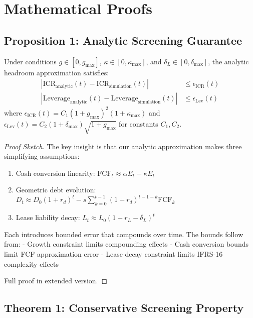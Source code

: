 
\appendix
\section{Mathematical Proofs}

\subsection{Proposition 1: Analytic Screening Guarantee}

\begin{proposition}
Under conditions $g \in [0, g_{\max}]$, $\kappa \in [0, \kappa_{\max}]$, and $\delta_L \in [0, \delta_{\max}]$, 
the analytic headroom approximation satisfies:
\begin{align}
|\text{ICR}_{\text{analytic}}(t) - \text{ICR}_{\text{simulation}}(t)| &\leq \epsilon_{\text{ICR}}(t) \\
|\text{Leverage}_{\text{analytic}}(t) - \text{Leverage}_{\text{simulation}}(t)| &\leq \epsilon_{\text{Lev}}(t)
\end{align}
where $\epsilon_{\text{ICR}}(t) = C_1(1 + g_{\max})^2(1 + \kappa_{\max})$ and 
$\epsilon_{\text{Lev}}(t) = C_2(1 + \delta_{\max})\sqrt{1 + g_{\max}}$ for constants $C_1, C_2$.
\end{proposition}

\begin{proof}[Proof Sketch]
The key insight is that our analytic approximation makes three simplifying assumptions:
\begin{enumerate}
\item Cash conversion linearity: $\text{FCF}_t \approx \alpha E_t - \kappa E_t$
\item Geometric debt evolution: $D_t \approx D_0(1+r_d)^t - s\sum_{k=0}^{t-1}(1+r_d)^{t-1-k}\text{FCF}_k$
\item Lease liability decay: $L_t \approx L_0(1+r_L-\delta_L)^t$
\end{enumerate}

Each introduces bounded error that compounds over time. The bounds follow from:
- Growth constraint limits compounding effects
- Cash conversion bounds limit FCF approximation error  
- Lease decay constraint limits IFRS-16 complexity effects

Full proof in extended version.
\end{proof}

\subsection{Theorem 1: Conservative Screening Property}

